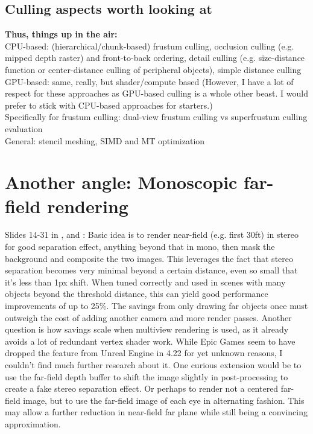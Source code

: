 \subsection{Culling aspects worth looking at}
\textbf{Thus, things up in the air: }\\
CPU-based: (hierarchical/chunk-based) frustum culling, occlusion culling (e.g. mipped depth raster) and front-to-back ordering, detail culling (e.g. size-distance function or center-distance culling of peripheral objects), simple distance culling\\
GPU-based: same, really, but shader/compute based (However, I have a lot of respect for these approaches as GPU-based culling is a whole other beast. I would prefer to stick with CPU-based approaches for starters.)\\
Specifically for frustum culling: dual-view frustum culling vs superfrustum culling evaluation\\
General: stencil meshing, SIMD and MT optimization

\section{Another angle: Monoscopic far-field rendering}
Slides 14-31 in \cite{DiDonato.01.03.2017}, \cite{EpicGamesInc..2016} and \cite{FacebookTechnologiesLLC..2016}: Basic idea is to render near-field (e.g. first 30ft) in stereo for good separation effect, anything beyond that in mono, then mask the background and composite the two images. This leverages the fact that stereo separation becomes very minimal beyond a certain distance, even so small that it's less than 1px shift. When tuned correctly and used in scenes with many objects beyond the threshold distance, this can yield good performance improvements of up to 25\%. The savings from only drawing far objects once must outweigh the cost of adding another camera and more render passes. 
Another question is how savings scale when multiview rendering is used, as it already avoids a lot of redundant vertex shader work. 
While Epic Games seem to have dropped the feature from Unreal Engine in 4.22 for yet unknown reasons, I couldn't find much further research about it. 
One curious extension would be to use the far-field depth buffer to shift the image slightly in post-processing to create a fake stereo separation effect. Or perhaps to render not a centered far-field image, but to use the far-field image of each eye in alternating fashion. This may allow a further reduction in near-field far plane while still being a convincing approximation. 

